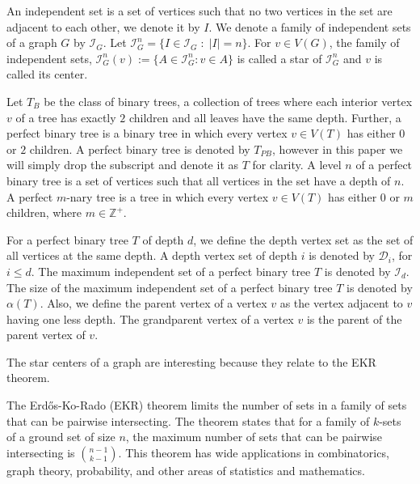 \documentclass[10pt]{amsart}
\theoremstyle{definition}
\begin{document}
An independent set is a set of vertices such that no two vertices in the set are adjacent to each other, we denote it by $I$. We denote a family of independent sets of a graph $G$ by $\mathcal{I}_G$. Let $\mathcal{I}_G^{n}=\{I\in \mathcal{I}_G \;:\; |I|=n\}$. For $v \in V(G)$, the family of independent sets, $\mathcal{I}^n_G(v) := \{A \in \mathcal{I}^n_G : v \in A\}$ is called a star of $\mathcal{I}^n_G$ and $v$ is called its center.

Let $T_B$ be the class of binary trees, a collection of trees where each interior vertex $v$ of a tree has exactly $2$ children and all leaves have the same depth. Further, a perfect binary tree is a binary tree in which every vertex $v \in V(T)$ has either $0$ or $2$ children. A perfect binary tree is denoted by $T_{PB}$, however in this paper we will simply drop the subscript and denote it as $T$ for clarity. A level $n$ of a perfect binary tree is a set of vertices such that all vertices in the set have a depth of $n$. A perfect $m$-nary tree is a tree in which every vertex $v \in V(T)$ has either $0$ or $m$ children, where $m \in \mathbb{Z}^+$.

For a perfect binary tree $T$ of depth $d$, we define the depth vertex set as the set of all vertices at the same depth. A depth vertex set of depth $i$ is denoted by $\mathcal{D}_i$, for $i \leq d$. The maximum independent set of a perfect binary tree $T$ is denoted by $\mathcal{I}_d$. The size of the maximum independent set of a perfect binary tree $T$ is denoted by $\alpha(T)$. Also, we define the parent vertex of a vertex $v$ as the vertex adjacent to $v$ having one less depth. The grandparent vertex of a vertex $v$ is the parent of the parent vertex of $v$.

The star centers of a graph are interesting because they relate to the EKR theorem.

The Erd\H{o}s-Ko-Rado (EKR) theorem limits the number of sets in a family of sets that can be pairwise intersecting. The theorem states that for a family of $k$-sets of a ground set of size $n$, the maximum number of sets that can be pairwise intersecting is $\binom{n-1}{k-1}$. This theorem has wide applications in combinatorics, graph theory, probability, and other areas of statistics and mathematics.
\end{document}
